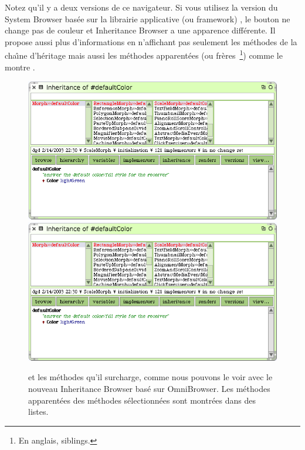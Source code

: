 \documentclass[a4paper,10pt,twoside]{book}
\begin{document}
Notez qu'il y a deux versions de ce navigateur. Si vous utilisez la version du
System Browser bas\'ee sur la librairie applicative (ou framework) , le bouton  ne change pas de couleur et Inheritance Browser a une apparence diff\'erente.  
Il propose aussi plus d'informations en n'affichant pas seulement les m\'ethodes de la cha\^{\i}ne d'h\'eritage mais aussi les m\'ethodes apparent\'ees (ou fr\`eres~\footnote{En anglais, siblings.}) comme le montre .

\begin{figure}[btp]
	\begin{center}
   \ifluluelse
		{\includegraphics[width=\textwidth]{OBInheritanceOverriding}}
		{\includegraphics[scale=0.7]{OBInheritanceOverriding}}
	\end{center}
	\caption{ et les m\'ethodes qu'il surcharge, comme nous pouvons le voir avec le nouveau Inheritance Browser bas\'e sur OmniBrowser. Les m\'ethodes apparent\'ees des m\'ethodes s\'electionn\'ees sont montr\'ees dans des listes.}
	\label{fig:OBinheritanceBrowser}
\end{figure}
\end{document}
